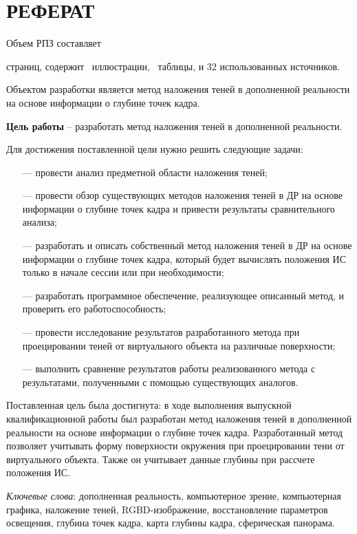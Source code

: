 \chapter*{РЕФЕРАТ}

Объем РПЗ составляет \begin{NoHyper}\pageref{LastPage}\end{NoHyper} страниц, содержит \totfig~иллюстрации, \tottab~таблицы, и 32 использованных источников.

Объектом разработки является метод наложения теней в дополненной реальности на основе информации о глубине точек кадра.

\textbf{Цель работы} -- разработать метод наложения теней в дополненной реальности.

Для достижения поставленной цели нужно решить следующие задачи:

\begin{itemize}
	\item[---] провести анализ предметной области наложения теней;
	\item[---] провести обзор существующих методов наложения теней в ДР на основе информации о глубине точек кадра и привести результаты сравнительного анализа;
	\item[---] разработать и описать собственный метод наложения теней в ДР на основе информации о глубине точек кадра, который будет вычислять положения ИС только в начале сессии или при необходимости;
	\item[---] разработать программное обеспечение, реализующее описанный метод, и проверить его работоспособность;
	\item[---] провести исследование результатов разработанного метода при проецировании теней от виртуального объекта на различные поверхности;
	\item[---] выполнить сравнение результатов работы реализованного метода с результатами, полученными с помощью существующих аналогов.
\end{itemize}

Поставленная цель была достигнута: в ходе выполнения выпускной квалификационной работы был разработан метод наложения теней в дополненной реальности на основе информации о глубине точек кадра. Разработанный метод позволяет учитывать форму поверхности окружения при проецировании тени от виртуального объекта. Также он учитывает данные глубины при рассчете положения ИС.

\textit{Ключевые слова}: дополненная реальность, компьютерное зрение, компьютерная графика, наложение теней, RGBD-изображение, восстановление параметров освещения, глубина точек кадра, карта глубины кадра, сферическая панорама.